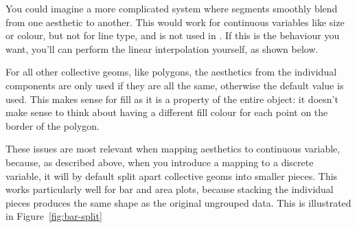 % 


You could imagine a more complicated system where segments smoothly blend from one aesthetic to another.  This would work for continuous variables like size or colour, but not for line type, and is not used in \ggplot.  If this is the behaviour you want, you'll can perform the linear interpolation yourself, as shown below.  

% 


For all other collective geoms, like polygons, the aesthetics from the individual components are only used if they are all the same, otherwise the default value is used.  This makes sense for fill as it is a property of the entire object: it doesn't make sense to think about having a different fill colour for each point on the border of the polygon.

These issues are most relevant when mapping aesthetics to continuous variable, because, as described above, when you introduce a mapping to a discrete variable, it will by default split apart collective geoms into smaller pieces.  This works particularly well for bar and area plots, because stacking the individual pieces produces the same shape as the original ungrouped data.  This is illustrated in Figure~\ref{fig:bar-split}

% 

